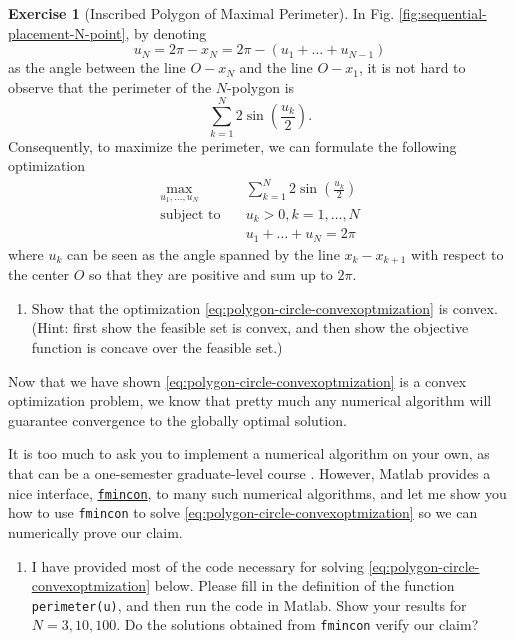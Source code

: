 \documentclass[
]{book}
\providecommand{\tightlist}{%
  \setlength{\itemsep}{0pt}\setlength{\parskip}{0pt}}
\theoremstyle{definition}
\theoremstyle{definition}
\theoremstyle{definition}
\newtheorem{exercise}{Exercise}[chapter]
\theoremstyle{definition}
\theoremstyle{remark}
\begin{document}
\begin{exercise}[Inscribed Polygon of Maximal Perimeter]
In Fig. \ref{fig:sequential-placement-N-point}, by denoting
\[
u_N = 2\pi - x_N = 2\pi - (u_1 + \dots + u_{N-1})
\]
as the angle between the line \(O-x_{N}\) and the line \(O-x_1\), it is not hard to observe that the perimeter of the \(N\)-polygon is
\[
\sum_{k=1}^N 2 \sin \left( \frac{u_k}{2} \right).
\]
Consequently, to maximize the perimeter, we can formulate the following optimization
\begin{equation}
\begin{split}
\max_{u_1,\dots,u_N} &\quad \sum_{k=1}^N 2 \sin \left( \frac{u_k}{2} \right) \\
\text{subject to} &\quad u_k > 0, k=1,\dots,N \\
&\quad u_1 + \dots + u_N = 2 \pi
\end{split}
\label{eq:polygon-circle-convexoptmization}
\end{equation}
where \(u_k\) can be seen as the angle spanned by the line \(x_k - x_{k+1}\) with respect to the center \(O\) so that they are positive and sum up to \(2\pi\).

\begin{enumerate}
\def\labelenumi{\alph{enumi}.}
\setcounter{enumi}{5}
\tightlist
\item
  Show that the optimization \eqref{eq:polygon-circle-convexoptmization} is convex. (Hint: first show the feasible set is convex, and then show the objective function is concave over the feasible set.)
\end{enumerate}

Now that we have shown \eqref{eq:polygon-circle-convexoptmization} is a convex optimization problem, we know that pretty much any numerical algorithm will guarantee convergence to the globally optimal solution.

It is too much to ask you to implement a numerical algorithm on your own, as that can be a one-semester graduate-level course \citep{nocedal99book-numerical}. However, Matlab provides a nice interface, \href{https://www.mathworks.com/help/optim/ug/fmincon.html}{\texttt{fmincon}}, to many such numerical algorithms, and let me show you how to use \texttt{fmincon} to solve \eqref{eq:polygon-circle-convexoptmization} so we can numerically prove our claim.

\begin{enumerate}
\def\labelenumi{\alph{enumi}.}
\setcounter{enumi}{6}
\tightlist
\item
  I have provided most of the code necessary for solving \eqref{eq:polygon-circle-convexoptmization} below. Please fill in the definition of the function \texttt{perimeter(u)}, and then run the code in Matlab. Show your results for \(N=3,10,100\). Do the solutions obtained from \texttt{fmincon} verify our claim?
\end{enumerate}


\end{exercise}
\end{document}
